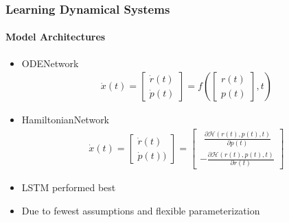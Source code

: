 \documentclass[usenames, dvipsnames, t]{beamer}
\begin{document}
\begin{frame}
\begin{figure}[!htbp]
\begin{adjustbox}{max width = 0.3\textwidth, height = 0.4\textheight}
		\end{adjustbox}
		\end{figure}
\end{frame}

\begin{frame}
	\frametitle{Learning Dynamical Systems}
	\framesubtitle{Model Architectures}
	\begin{itemize}	
		\item<+-> ODENetwork
		\begin{align*}
			\dot{x}(t) =
			\begin{bmatrix}
				\dot{r}(t) \\ 
				\dot{p}(t)
			\end{bmatrix}
			= f \left(
			\begin{bmatrix}
				r(t) \\ 
				p(t)
			\end{bmatrix}
			,t
			\right)
		\end{align*}
		\item<+-> HamiltonianNetwork
		\begin{align*}
			\dot{x}(t) = 
	\begin{bmatrix}
		\dot{r}(t) \\ \dot{p}(t)) 
	\end{bmatrix}
		= 
		\begin{bmatrix}
		\ \ \frac{\partial \mathcal{H}(r(t), p(t), t)}{\partial p(t)} \\ - \frac{\partial \mathcal{H}(r(t), p(t), t)}{\partial r(t)}
		\end{bmatrix}
		\end{align*}
		\item<+-> LSTM performed best
		\item<+-> Due to fewest assumptions and flexible parameterization
	\end{itemize}
\end{frame}
\end{document}
